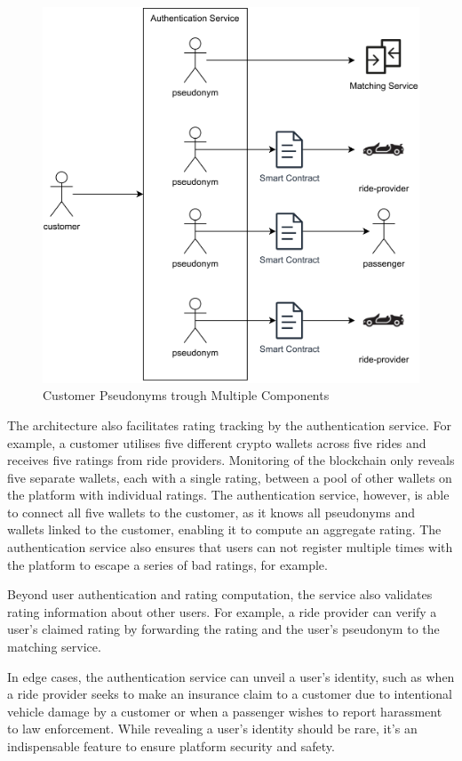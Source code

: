 \begin{figure}[h]
    \centering
    \includegraphics[height=0.40\textheight]{data/2.svg}
    \caption{Customer Pseudonyms trough Multiple Components}
    \label{fig:cp}
\end{figure}


The architecture also facilitates rating tracking by the authentication service. For example, a customer utilises five different crypto wallets across five rides and receives five ratings from ride providers. Monitoring of the blockchain only reveals five separate wallets, each with a single rating, between a pool of other wallets on the platform with individual ratings. The authentication service, however, is able to connect all five wallets to the customer, as it knows all pseudonyms and wallets linked to the customer, enabling it to compute an aggregate rating. The authentication service also ensures that users can not register multiple times with the platform to escape a series of bad ratings, for example.

Beyond user authentication and rating computation, the service also validates rating information about other users. For example, a ride provider can verify a user's claimed rating by forwarding the rating and the user's pseudonym to the matching service. 

In edge cases, the authentication service can unveil a user's identity, such as when a ride provider seeks to make an insurance claim to a customer due to intentional vehicle damage by a customer or when a passenger wishes to report harassment to law enforcement. While revealing a user's identity should be rare, it's an indispensable feature to ensure platform security and safety.

